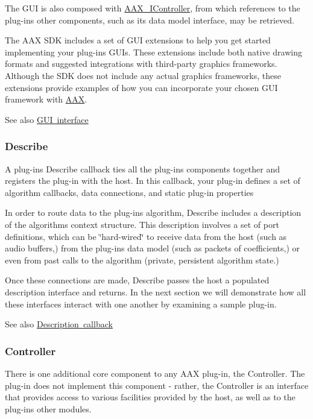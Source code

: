 The G\+UI is also composed with \mbox{\hyperlink{a01789}{A\+A\+X\+\_\+\+I\+Controller}}, from which references to the plug-\/in\textquotesingle{}s other components, such as its data model interface, may be retrieved.

The A\+AX S\+DK includes a set of G\+UI extensions to help you get started implementing your plug-\/ins\textquotesingle{} G\+U\+Is. These extensions include both native drawing formats and suggested integrations with third-\/party graphics frameworks. Although the S\+DK does not include any actual graphics frameworks, these extensions provide examples of how you can incorporate your chosen G\+UI framework with \mbox{\hyperlink{a00852}{A\+AX}}.

 \begin{DoxySeeAlso}{See also}
\mbox{\hyperlink{a00799}{G\+UI interface}}
\end{DoxySeeAlso}
\hypertarget{a00794_subsection__describe}{}\subsubsection{Describe}\label{a00794_subsection__describe}
A plug-\/in\textquotesingle{}s Describe callback ties all the plug-\/in\textquotesingle{}s components together and registers the plug-\/in with the host. In this callback, your plug-\/in defines a set of algorithm callbacks, data connections, and static plug-\/in properties

In order to route data to the plug-\/in\textquotesingle{}s algorithm, Describe includes a description of the algorithm\textquotesingle{}s context structure. This description involves a set of port definitions, which can be \char`\"{}hard-\/wired\char`\"{} to receive data from the host (such as audio buffers,) from the plug-\/in\textquotesingle{}s data model (such as packets of coefficients,) or even from past calls to the algorithm (private, persistent algorithm state.)

Once these connections are made, Describe passes the host a populated description interface and returns. In the next section we will demonstrate how all these interfaces interact with one another by examining a sample plug-\/in.

\begin{DoxySeeAlso}{See also}
\mbox{\hyperlink{a00796}{Description callback}}
\end{DoxySeeAlso}
\hypertarget{a00794_subsection__controller}{}\subsubsection{Controller}\label{a00794_subsection__controller}
There is one additional core component to any A\+AX plug-\/in, the Controller. The plug-\/in does not implement this component -\/ rather, the Controller is an interface that provides access to various facilities provided by the host, as well as to the plug-\/in\textquotesingle{}s other modules. 

